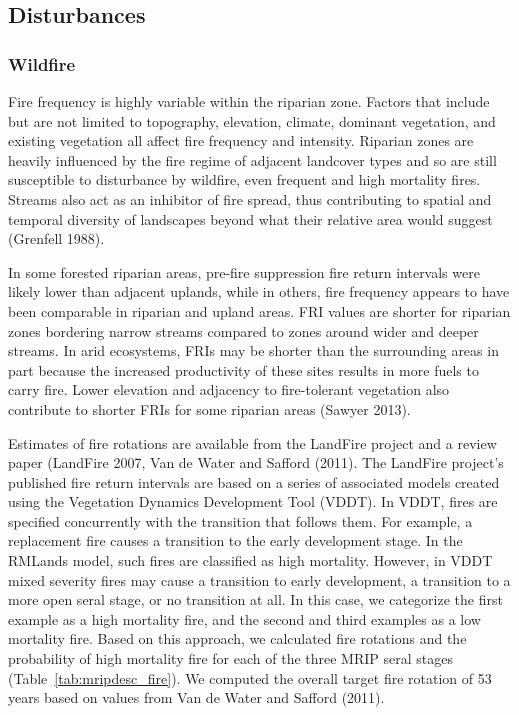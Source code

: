 \subsection*{Disturbances}

\subsubsection{Wildfire}
Fire frequency is highly variable within the riparian zone. Factors that include but are not limited to topography, elevation, climate, dominant vegetation, and existing vegetation all affect fire frequency and intensity. Riparian zones are heavily influenced by the fire regime of adjacent landcover types and so are still susceptible to disturbance by wildfire, even frequent and high mortality fires. Streams also act as an inhibitor of fire spread, thus contributing to spatial and temporal diversity of landscapes beyond what their relative area would suggest (Grenfell 1988). 

In some forested riparian areas, pre-fire suppression fire return intervals were likely lower than adjacent uplands, while in others, fire frequency appears to have been comparable in riparian and upland areas. FRI values are shorter for riparian zones bordering narrow streams compared to zones around wider and deeper streams. In arid ecosystems, FRIs may be shorter than the surrounding areas in part because the increased productivity of these sites results in more fuels to carry fire. Lower elevation and adjacency to fire-tolerant vegetation also contribute to shorter FRIs for some riparian areas (Sawyer 2013).

Estimates of fire rotations are available from the LandFire project and a review paper (LandFire 2007, Van de Water and Safford (2011). The LandFire project’s published fire return intervals are based on a series of associated models created using the Vegetation Dynamics Development Tool (VDDT). In VDDT, fires are specified concurrently with the transition that follows them. For example, a replacement fire causes a transition to the early development stage. In the RMLands model, such fires are classified as high mortality. However, in VDDT mixed severity fires may cause a transition to early development, a transition to a more open seral stage, or no transition at all. In this case, we categorize the first example as a high mortality fire, and the second and third examples as a low mortality fire. Based on this approach, we calculated fire rotations and the probability of high mortality fire for each of the three MRIP seral stages (Table~\ref{tab:mripdesc_fire}). We computed the overall target fire rotation of 53 years based on values from Van de Water and Safford (2011). 




